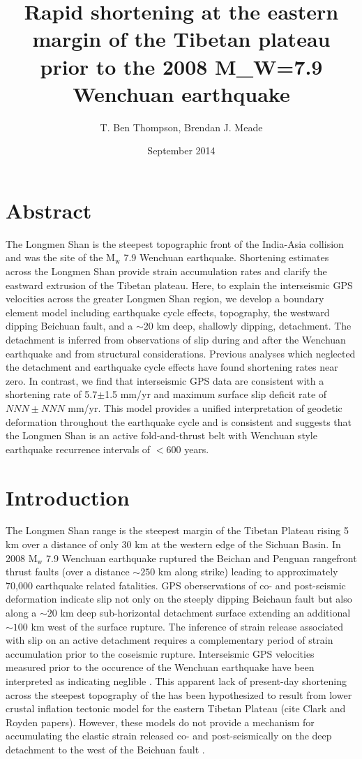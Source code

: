 \documentclass[12pt]{article}
\title{Rapid shortening at the eastern margin of the Tibetan plateau prior to the 2008 M_W=7.9 Wenchuan earthquake}
\author{T. Ben Thompson, Brendan J. Meade}
\date{September 2014}
\begin{document}
\maketitle

\section{Abstract}
The Longmen Shan is the steepest topographic front of the India-Asia collision and was the site of the $\textrm{M}_{\textrm{w}}$ 7.9  Wenchuan earthquake. Shortening estimates across the Longmen Shan provide strain accumulation rates and clarify the eastward extrusion of the Tibetan plateau. Here, to explain the interseismic GPS velocities across the greater Longmen Shan region, we develop a boundary element model including earthquake cycle effects, topography, the westward dipping Beichuan fault, and a $\sim 20$ km deep, shallowly dipping, detachment. The detachment is inferred from observations of slip during and after the Wenchuan earthquake and from structural considerations. Previous analyses which neglected the detachment and earthquake cycle effects have found shortening rates near zero. In contrast, we find that interseismic GPS data are consistent with a shortening rate of 5.7$\pm$1.5 mm/yr and maximum surface slip deficit rate of $NNN\pm NNN$ mm/yr. This model provides a unified interpretation of geodetic deformation throughout the earthquake cycle and is consistent and suggests that the Longmen Shan is an active fold-and-thrust belt with Wenchuan style earthquake recurrence intervals of $<$600 years.

\section{Introduction}
The Longmen Shan range is the steepest margin of the Tibetan Plateau rising 5 km over a distance of only 30 km at the western edge of the Sichuan Basin. In 2008 $\textrm{M}_{\textrm{w}}$ 7.9 Wenchuan earthquake ruptured the Beichan and Penguan rangefront thrust faults (over a distance $\sim 250$ km along strike) leading to approximately 70,000 earthquake related fatalities. GPS oberservations of co- and post-seismic deformation indicate slip not only on the steeply dipping Beichaun fault but also along a $\sim 20$ km deep sub-horizontal detachment surface extending an additional $\sim 100$ km west of the surface rupture. The inference of strain release associated with slip on an active detachment requires a complementary period of strain accumulation prior to the coseismic rupture. Interseismic GPS velocities measured prior to the occurence of the Wenchuan earthquake have been interpreted as indicating neglible \citep{king97, chen00, shen05, Meade07c, Loveless2011}. This apparent lack of present-day shortening across the steepest topography of the has been hypothesized to result from lower crustal inflation tectonic model for the eastern Tibetan Plateau (cite Clark and Royden papers)\citep{royden97, bird91, Burchfiel2008a}. However, these models do not provide a mechanism for accumulating the elastic strain released co- and post-seismically on the deep detachment to the west of the Beichuan fault \citep{Qi2011, Fielding2013b}.
\end{document}

